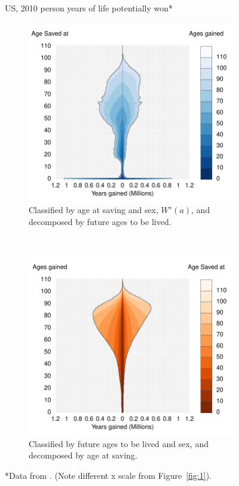 \documentclass{article}
\begin{document}
\begin{figure}
\centering
\caption{US, 2010 person years of life potentially won*}
\label{fig:2}
\begin{subfigure}[b]{.48\linewidth}
\centering
	\caption{Classified by age at saving and sex, $W^s(a)$, and decomposed by
	future ages to be lived.}
	\label{fig:SavedGained}
	\includegraphics[scale=.55]{Figures/YearsSavedGainedxx10.pdf}	
\end{subfigure}
~
\begin{subfigure}[b]{.48\linewidth}
\centering
    \caption{Classified by future ages to be lived and sex, and decomposed
    by age at saving.}
	\label{fig:LostLived}
    \includegraphics[scale=.55]{Figures/YearsLostLivedyx10.pdf}
\end{subfigure}
\caption*{*Data from . (Note different x scale from
Figure~\ref{fig:1}).}
\end{figure}
\end{document}
